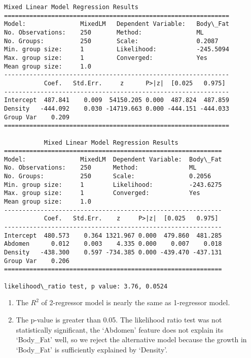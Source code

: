 \documentclass[11pt]{article}
\providecommand{\tightlist}{%
      \setlength{\itemsep}{0pt}\setlength{\parskip}{0pt}}
\begin{document}
    \begin{Verbatim}[commandchars=\\\{\}]
            Mixed Linear Model Regression Results
==============================================================
Model:               MixedLM   Dependent Variable:   Body\_Fat 
No. Observations:    250       Method:               ML       
No. Groups:          250       Scale:                0.2087   
Min. group size:     1         Likelihood:           -245.5094
Max. group size:     1         Converged:            Yes      
Mean group size:     1.0                                      
--------------------------------------------------------------
           Coef.   Std.Err.     z      P>|z|  [0.025   0.975] 
--------------------------------------------------------------
Intercept  487.841    0.009  54150.205 0.000  487.824  487.859
Density   -444.092    0.030 -14719.663 0.000 -444.151 -444.033
Group Var    0.209                                            
==============================================================

           Mixed Linear Model Regression Results
============================================================
Model:               MixedLM  Dependent Variable:  Body\_Fat 
No. Observations:    250      Method:              ML       
No. Groups:          250      Scale:               0.2056   
Min. group size:     1        Likelihood:          -243.6275
Max. group size:     1        Converged:           Yes      
Mean group size:     1.0                                    
------------------------------------------------------------
           Coef.   Std.Err.    z     P>|z|  [0.025   0.975] 
------------------------------------------------------------
Intercept  480.573    0.364 1321.967 0.000  479.860  481.285
Abdomen      0.012    0.003    4.335 0.000    0.007    0.018
Density   -438.300    0.597 -734.385 0.000 -439.470 -437.131
Group Var    0.206                                          
============================================================

likelihood\_ratio test, p value: 3.76, 0.0524

    \end{Verbatim}

    \begin{enumerate}
\def\labelenumi{\arabic{enumi}.}
\tightlist
\item
  The \(R^2\) of 2-regressor model is nearly the same as 1-regressor
  model.
\item
  The p-value is greater than 0.05. The likelihood ratio test was not
  statistically significant, the `Abdomen' feature does not explain its
  `Body\_Fat' well, so we reject the alternative model because the
  growth in `Body\_Fat' is sufficiently explained by `Density'.
\end{enumerate}
\end{document}
